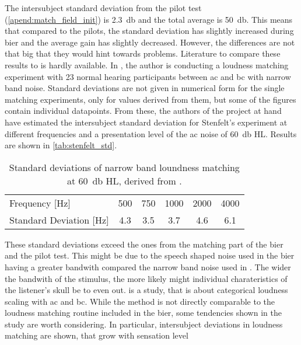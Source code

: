 The intersubject standard deviation from the pilot test (\autoref{apend:match_field_init}) is \SI{2.3}{\decibel} and the total average is \SI{50}{\decibel}.
This means that compared to the pilots, the standard deviation has slightly increased during \gls{bier} and the average gain has slightly decreased.
However, the differences are not that big that they would hint towards problems.
Literature to compare these results to is hardly available.
In \citep{stenfelt_02}, the author is conducting a loudness matching experiment with 23 normal hearing participants between \gls{ac} and \gls{bc} with narrow band noise. Standard deviations are not given in numerical form for the single matching experiments, only for values derived from them, but some of the figures contain individual datapoints.
From these, the authors of the project at hand have estimated the intersubject standard deviation for Stenfelt's experiment at different frequencies and a presentation level of the \gls{ac} noise of \SI{60}{\decibel} HL. Results are shown in \autoref{tab:stenfelt_std}.
\begin{table}[H]
\caption{Standard deviations of narrow band loundness matching at \SI{60}{\decibel} HL, derived from \citep[Fig. 1 b)-c)]{stenfelt_02}.}
\label{tab:stenfelt_std}
\centering
\begin{tabular}{lccccc}
Frequency [\si{\hertz}]          & 500 & 750 & 1000 & 2000 & 4000 \\
Standard Deviation [\si{\hertz}] & 4.3 & 3.5 & 3.7  & 4.6  & 6.1 
\end{tabular}
\end{table}
These standard deviations exceed the ones from the matching part of the \gls{bier} and the pilot test. This might be due to the speech shaped noise used in the \gls{bier} having a greater bandwith compared the narrow band noise used in \citep{stenfelt_02}. The wider the bandwith of the stimulus, the more likely might individual charateristics of the listener's skull be to even out.
\citep{STENFELT201385} is a study, that is about categorical loudness scaling with \gls{ac} and \gls{bc}. While the method is not directly comparable to the loudness matching routine included in the \gls{bier}, some tendencies shown in the study are worth considering. In particular, intersubject deviations in loudness matching are shown, that grow with sensation level

